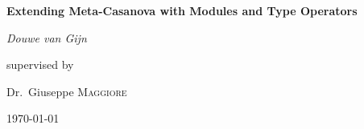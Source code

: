 \documentclass[12pt,a4paper]{report}
\begin{document}
\begin{titlepage}
	\centering
	       {\huge\bfseries Extending Meta-Casanova with Modules and Type Operators\par}
	\vspace{2cm}
	{\Large\itshape Douwe van Gijn\par}
	\vfill
	supervised by\par
	Dr.~Giuseppe \textsc{Maggiore}
	\vfill
	{\large \today\par}
\end{titlepage}
\end{document}
